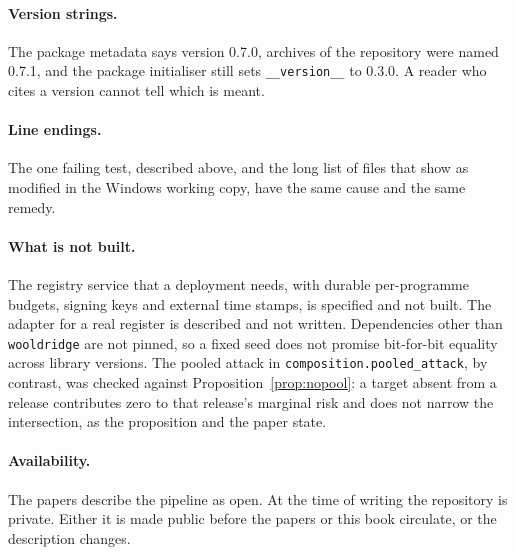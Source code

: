 \paragraph{Version strings.} The package metadata says version 0.7.0, archives of
the repository were named 0.7.1, and the package initialiser still sets
\texttt{\_\allowbreak{}\_\allowbreak{}version\_\allowbreak{}\_\allowbreak{}} to 0.3.0. %
A reader who cites a version cannot tell which is meant.

\paragraph{Line endings.} The one failing test, described above, and the long list of
files that show as modified in the Windows working copy, have the same cause and the
same remedy.

\paragraph{What is not built.} The registry service that a deployment needs, with
durable per-programme budgets, signing keys and external time stamps, is specified and
not built. The adapter for a real register is described and not written. Dependencies
other than \texttt{wooldridge} are not pinned, so a fixed seed does not promise
bit-for-bit equality across library versions. %
The pooled attack in \texttt{composition.\allowbreak{}pooled\_\allowbreak{}attack}, by contrast, was checked
against Proposition~\ref{prop:nopool}: a target absent from a release contributes zero
to that release's marginal risk and does not narrow the intersection, as the
proposition and the paper state.

\paragraph{Availability.} The papers describe the pipeline as open. At the time of
writing the repository is private. Either it is made public before the papers or this
book circulate, or the description changes.
